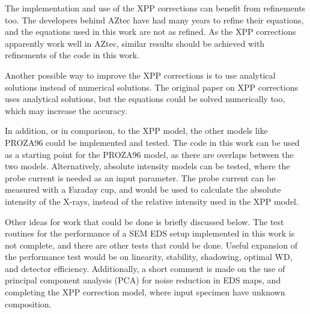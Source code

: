 The implementation and use of the XPP corrections can benefit from refinements too.
The developers behind AZtec have had many years to refine their equations, and the equations used in this work are not as refined.
As the XPP corrections apparently work well in AZtec, similar results should be achieved with refinements of the code in this work.

Another possible way to improve the XPP corrections is to use analytical solutions instead of numerical solutions.
The original paper on XPP corrections \cite{pap_1991} uses analytical solutions, but the equations could be solved numerically too, which may increase the accuracy.

In addition, or in comparison, to the XPP model, the other models like PROZA96 could be implemented and tested.
The code in this work can be used as a starting point for the PROZA96 model, as there are overlaps between the two models.
Alternatively, absolute intensity models can be tested, where the probe current is needed as an input parameter.
The probe current can be measured with a Faraday cup, and would be used to calculate the absolute intensity of the X-rays, instead of the relative intensity used in the XPP model.







Other ideas for work that could be done is briefly discussed below.
The test routines for the performance of a SEM EDS setup implemented in this work is not complete, and there are other tests that could be done.
Useful expansion of the performance test would be on linearity, stability, shadowing, optimal WD, and detector efficiency. 
Additionally, a short comment is made on the use of principal component analysis (PCA) for noise reduction in EDS maps, and completing the XPP correction model, where input specimen have unknown composition.

